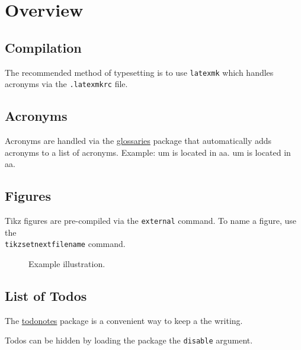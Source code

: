 
\chapter{Overview}

\section{Compilation}

The recommended method of typesetting is to use \texttt{latexmk} which handles acronyms via the \texttt{.latexmkrc} file.

\section{Acronyms}

Acronyms are handled via the \href{https://www.ctan.org/pkg/glossaries}{glossaries} package that automatically adds acronyms to a list of acronyms. Example: \gls{um} is located in \gls{aa}. \gls{um} is located in \gls{aa}. 

\section{Figures}

Tikz figures are pre-compiled via the \texttt{external} command. To name a figure, use the \texttt{\\tikzsetnextfilename} command.

\begin{figure}[h]
	\begin{center}
	\end{center}
	\caption{Example illustration.}
\end{figure}

\section{List of Todos}

The \href{https://www.ctan.org/pkg/todonotes}{todonotes} package is a convenient way to keep a  the writing.  


Todos can be hidden by loading the package the \texttt{disable} argument.